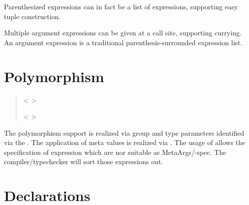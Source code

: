 Parenthesized expressions can in fact be a list of expressions,
supporting easy tuple construction.

Multiple argument expressions can be given at a call
site, supporting currying.  An argument expression is a
traditional parenthesis-surrounded expression list.


\section{Polymorphism}

\begin{quote}


 <   >


 {}  

 {}  


 {}

 {}

 {}


 <   >

\end{quote}

The polymorphism support is realized via group and type parameters
identified via the . The application of meta
values is realized via . The usage of
 allows the specification of expression which are
nor suitable as MetaArgs/-spec. The compiler/typechecker will sort
those expressions out.

\section{Declarations}

